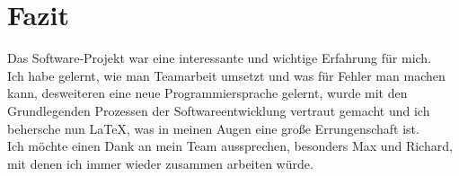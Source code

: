 \documentclass[a4paper]{scrreprt}
\begin{document}
\section{Fazit}

Das Software-Projekt war eine interessante und wichtige Erfahrung für mich.\\ 
Ich habe gelernt, wie man Teamarbeit umsetzt und was für Fehler man machen kann, desweiteren eine neue Programmiersprache gelernt, wurde mit den Grundlegenden Prozessen der Softwareentwicklung vertraut gemacht und ich behersche nun LaTeX, was in meinen Augen eine große Errungenschaft ist.\\
Ich möchte einen Dank an mein Team aussprechen, besonders Max und Richard, mit denen ich immer wieder zusammen arbeiten würde.\\
\end{document}

